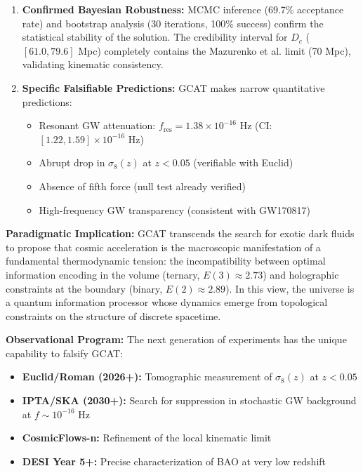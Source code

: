 \documentclass[12pt, a4paper]{article}
\theoremstyle{plain}
\theoremstyle{definition}
\begin{document}
\begin{enumerate}
    \item \textbf{Confirmed Bayesian Robustness:} MCMC inference (69.7\% acceptance rate) and bootstrap analysis (30 iterations, 100\% success) confirm the statistical stability of the solution. The credibility interval for $D_c$ ($[61.0, 79.6]$ Mpc) completely contains the Mazurenko et al. limit (70 Mpc), validating kinematic consistency.
    
    \item \textbf{Specific Falsifiable Predictions:} GCAT makes narrow quantitative predictions:
    \begin{itemize}
        \item Resonant GW attenuation: $f_{\text{res}} = 1.38 \times 10^{-16}$ Hz (CI: $[1.22, 1.59] \times 10^{-16}$ Hz)
        \item Abrupt drop in $\sigma_8(z)$ at $z < 0.05$ (verifiable with Euclid)
        \item Absence of fifth force (null test already verified)
        \item High-frequency GW transparency (consistent with GW170817)
    \end{itemize}
\end{enumerate}

\textbf{Paradigmatic Implication:} GCAT transcends the search for exotic dark fluids to propose that cosmic acceleration is the macroscopic manifestation of a fundamental thermodynamic tension: the incompatibility between optimal information encoding in the volume (ternary, $E(3) \approx 2.73$) and holographic constraints at the boundary (binary, $E(2) \approx 2.89$). In this view, the universe is a quantum information processor whose dynamics emerge from topological constraints on the structure of discrete spacetime.

\textbf{Observational Program:} The next generation of experiments has the unique capability to falsify GCAT:
\begin{itemize}
    \item \textbf{Euclid/Roman (2026+):} Tomographic measurement of $\sigma_8(z)$ at $z < 0.05$
    \item \textbf{IPTA/SKA (2030+):} Search for suppression in stochastic GW background at $f \sim 10^{-16}$ Hz
    \item \textbf{CosmicFlows-n:} Refinement of the local kinematic limit
    \item \textbf{DESI Year 5+:} Precise characterization of BAO at very low redshift
\end{itemize}
\end{document}
